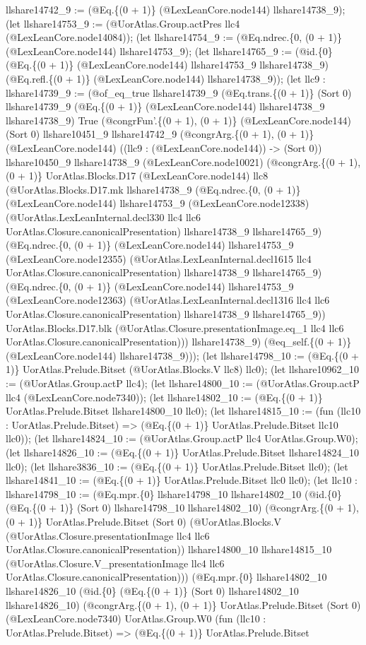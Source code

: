 \documentclass[11pt]{article}
\begin{document}
llshare14742\_9 := (@Eq.\{(0 + 1)\} (@LexLeanCore.node144) llshare14738\_9); (let llshare14753\_9 := (@UorAtlas.Group.actPres llc4 (@LexLeanCore.node14084)); (let llshare14754\_9 := (@Eq.ndrec.\{0, (0 + 1)\} (@LexLeanCore.node144) llshare14753\_9); (let llshare14765\_9 := (@id.\{0\} (@Eq.\{(0 + 1)\} (@LexLeanCore.node144) llshare14753\_9 llshare14738\_9) (@Eq.refl.\{(0 + 1)\} (@LexLeanCore.node144) llshare14738\_9)); (let llc9 : llshare14739\_9 := (@of\_eq\_true llshare14739\_9 (@Eq.trans.\{(0 + 1)\} (Sort 0) llshare14739\_9 (@Eq.\{(0 + 1)\} (@LexLeanCore.node144) llshare14738\_9 llshare14738\_9) True (@congrFun'.\{(0 + 1), (0 + 1)\} (@LexLeanCore.node144) (Sort 0) llshare10451\_9 llshare14742\_9 (@congrArg.\{(0 + 1), (0 + 1)\} (@LexLeanCore.node144) ((llc9 : (@LexLeanCore.node144)) -> (Sort 0)) llshare10450\_9 llshare14738\_9 (@LexLeanCore.node10021) (@congrArg.\{(0 + 1), (0 + 1)\} UorAtlas.Blocks.D17 (@LexLeanCore.node144) llc8 (@UorAtlas.Blocks.D17.mk llshare14738\_9 (@Eq.ndrec.\{0, (0 + 1)\} (@LexLeanCore.node144) llshare14753\_9 (@LexLeanCore.node12338) (@UorAtlas.LexLeanInternal.decl330 llc4 llc6 UorAtlas.Closure.canonicalPresentation) llshare14738\_9 llshare14765\_9) (@Eq.ndrec.\{0, (0 + 1)\} (@LexLeanCore.node144) llshare14753\_9 (@LexLeanCore.node12355) (@UorAtlas.LexLeanInternal.decl1615 llc4 UorAtlas.Closure.canonicalPresentation) llshare14738\_9 llshare14765\_9) (@Eq.ndrec.\{0, (0 + 1)\} (@LexLeanCore.node144) llshare14753\_9 (@LexLeanCore.node12363) (@UorAtlas.LexLeanInternal.decl1316 llc4 llc6 UorAtlas.Closure.canonicalPresentation) llshare14738\_9 llshare14765\_9)) UorAtlas.Blocks.D17.blk (@UorAtlas.Closure.presentationImage.eq\_1 llc4 llc6 UorAtlas.Closure.canonicalPresentation))) llshare14738\_9) (@eq\_self.\{(0 + 1)\} (@LexLeanCore.node144) llshare14738\_9))); (let llshare14798\_10 := (@Eq.\{(0 + 1)\} UorAtlas.Prelude.Bitset (@UorAtlas.Blocks.V llc8) llc0); (let llshare10962\_10 := (@UorAtlas.Group.actP llc4); (let llshare14800\_10 := (@UorAtlas.Group.actP llc4 (@LexLeanCore.node7340)); (let llshare14802\_10 := (@Eq.\{(0 + 1)\} UorAtlas.Prelude.Bitset llshare14800\_10 llc0); (let llshare14815\_10 := (fun (llc10 : UorAtlas.Prelude.Bitset) => (@Eq.\{(0 + 1)\} UorAtlas.Prelude.Bitset llc10 llc0)); (let llshare14824\_10 := (@UorAtlas.Group.actP llc4 UorAtlas.Group.W0); (let llshare14826\_10 := (@Eq.\{(0 + 1)\} UorAtlas.Prelude.Bitset llshare14824\_10 llc0); (let llshare3836\_10 := (@Eq.\{(0 + 1)\} UorAtlas.Prelude.Bitset llc0); (let llshare14841\_10 := (@Eq.\{(0 + 1)\} UorAtlas.Prelude.Bitset llc0 llc0); (let llc10 : llshare14798\_10 := (@Eq.mpr.\{0\} llshare14798\_10 llshare14802\_10 (@id.\{0\} (@Eq.\{(0 + 1)\} (Sort 0) llshare14798\_10 llshare14802\_10) (@congrArg.\{(0 + 1), (0 + 1)\} UorAtlas.Prelude.Bitset (Sort 0) (@UorAtlas.Blocks.V (@UorAtlas.Closure.presentationImage llc4 llc6 UorAtlas.Closure.canonicalPresentation)) llshare14800\_10 llshare14815\_10 (@UorAtlas.Closure.V\_presentationImage llc4 llc6 UorAtlas.Closure.canonicalPresentation))) (@Eq.mpr.\{0\} llshare14802\_10 llshare14826\_10 (@id.\{0\} (@Eq.\{(0 + 1)\} (Sort 0) llshare14802\_10 llshare14826\_10) (@congrArg.\{(0 + 1), (0 + 1)\} UorAtlas.Prelude.Bitset (Sort 0) (@LexLeanCore.node7340) UorAtlas.Group.W0 (fun (llc10 : UorAtlas.Prelude.Bitset) => (@Eq.\{(0 + 1)\} UorAtlas.Prelude.Bitset 
\end{document}
